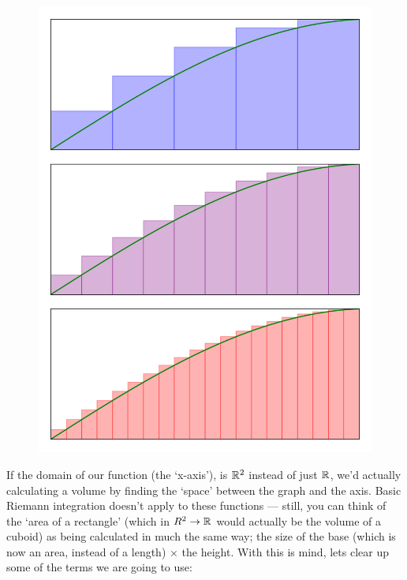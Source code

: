 \begin{figure}[H]
\begin{minipage}{.5\textwidth}
  \includegraphics{Code/Area2.png}
  \label{fig:areaabove}
\end{minipage}
\end{figure}

If the domain of our function (the `x-axis'), is $\mathbb{R}^2$ instead of just $\mathbb{R}$, we'd actually calculating a volume by finding the `space' between the graph and the axis. Basic Riemann integration doesn't apply to these functions --- still, you can think of the `area of a rectangle' (which in $R^2 \rightarrow \mathbb{R}$ would actually be the volume of a cuboid) as being calculated in much the same way; the size of the base (which is now an area, instead of a length) $\times$ the height. With this is mind, lets clear up some of the terms we are going to use:

